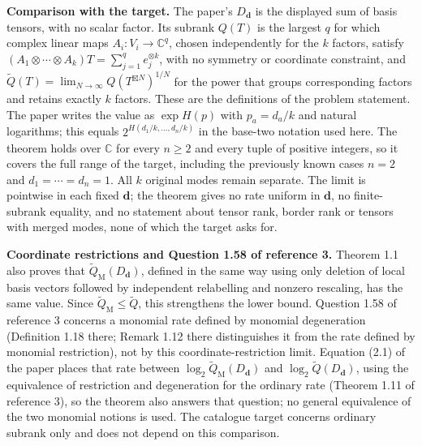 \documentclass[11pt,a4paper]{article}
\begin{document}
\textbf{Comparison with the target.} The paper's \(D_{\mathbf d}\) is
the displayed sum of basis tensors, with no scalar factor. Its subrank
\(Q(T)\) is the largest \(q\) for which complex linear maps
\(A_i:V_i\to\mathbb C^q\), chosen independently for the \(k\) factors,
satisfy \((A_1\otimes\cdots\otimes A_k)T=\sum_{j=1}^q e_j^{\otimes k}\),
with no symmetry or coordinate constraint, and
\(\widetilde Q(T)=\lim_{N\to\infty}Q(T^{\boxtimes N})^{1/N}\) for the
power that groups corresponding factors and retains exactly \(k\)
factors. These are the definitions of the problem statement. The paper
writes the value as \(\exp H(p)\) with \(p_a=d_a/k\) and natural
logarithms; this equals \(2^{H(d_1/k,\ldots,d_n/k)}\) in the base-two
notation used here. The theorem holds over \(\mathbb C\) for every
\(n\ge2\) and every tuple of positive integers, so it covers the full
range of the target, including the previously known cases \(n=2\) and
\(d_1=\cdots=d_n=1\). All \(k\) original modes remain separate. The
limit is pointwise in each fixed \(\mathbf d\); the theorem gives no
rate uniform in \(\mathbf d\), no finite-subrank equality, and no
statement about tensor rank, border rank or tensors with merged modes,
none of which the target asks for.

\textbf{Coordinate restrictions and Question 1.58 of reference 3.}
Theorem 1.1 also proves that
\(\widetilde Q_{\mathrm M}(D_{\mathbf d})\), defined in the same way
using only deletion of local basis vectors followed by independent
relabelling and nonzero rescaling, has the same value. Since
\(\widetilde Q_{\mathrm M}\le\widetilde Q\), this strengthens the lower
bound. Question 1.58 of reference 3 concerns a monomial rate defined by
monomial degeneration (Definition 1.18 there; Remark 1.12 there
distinguishes it from the rate defined by monomial restriction), not by
this coordinate-restriction limit. Equation (2.1) of the paper places
that rate between \(\log_2\widetilde Q_{\mathrm M}(D_{\mathbf d})\) and
\(\log_2\widetilde Q(D_{\mathbf d})\), using the equivalence of
restriction and degeneration for the ordinary rate (Theorem 1.11 of
reference 3), so the theorem also answers that question; no general
equivalence of the two monomial notions is used. The catalogue target
concerns ordinary subrank only and does not depend on this comparison.
\end{document}
